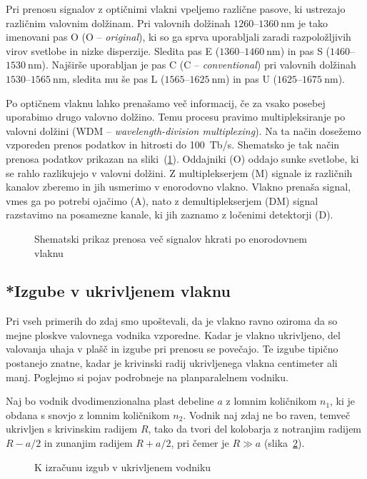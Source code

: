 \begin{remark}
Pri prenosu signalov z optičnimi vlakni vpeljemo različne pasove, ki ustrezajo 
različnim valovnim dolžinam. Pri valovnih dolžinah $1260$--$1360~\si{\nano\meter}$ je tako imenovani
pas O (O -- {\it original}), ki so ga sprva uporabljali zaradi razpoložljivih virov svetlobe
in nizke disperzije. Sledita pas E ($1360$--$1460~\si{\nano\meter}$) in pas S ($1460$--$1530~\si{\nano\meter}$). 
Najširše uporabljan je pas C (C -- {\it conventional}) pri valovnih dolžinah $1530$--$1565~\si{\nano\meter}$,
sledita mu še pas L ($1565$--$1625~\si{\nano\meter}$) in pas U ($1625$--$1675~\si{\nano\meter}$).

Po optičnem vlaknu lahko prenašamo več informacij, če za vsako posebej uporabimo
drugo valovno dolžino. Temu procesu pravimo multipleksiranje po valovni dolžini
(WDM -- {\it wavelength-division multiplexing}).
Na ta način dosežemo vzporeden prenos podatkov in hitrosti do 100~Tb/s.
Shematsko je tak način prenosa podatkov prikazan na sliki~(\ref{WDM}).
Oddajniki (O) oddajo sunke svetlobe, ki se rahlo razlikujejo v valovni dolžini. 
Z multiplekserjem (M) signale iz različnih kanalov zberemo in jih usmerimo v 
enorodovno vlakno. Vlakno prenaša signal, vmes ga po potrebi ojačimo (A), 
nato z demultiplekserjem (DM) signal razstavimo na posamezne kanale, ki jih 
zaznamo z ločenimi detektorji (D).
\begin{figure}[h]
\centering
\def\svgwidth{120truemm} 
 
\caption{Shematski prikaz prenosa več signalov hkrati po enorodovnem vlaknu}
\label{WDM}
\end{figure}
\end{remark}

\subsection*{*Izgube v ukrivljenem vlaknu}
Pri vseh primerih do zdaj smo upoštevali, da je vlakno ravno 
oziroma da so mejne ploskve valovnega vodnika vzporedne. 
Kadar je vlakno ukrivljeno, del valovanja uhaja v plašč in 
izgube pri prenosu se povečajo. Te izgube tipično postanejo znatne, 
kadar je krivinski radij ukrivljenega vlakna centimeter ali manj. 
Poglejmo si pojav podrobneje na planparalelnem vodniku.

Naj bo vodnik dvodimenzionalna plast debeline $a$ z lomnim količnikom
$n_{1}$, ki je obdana s snovjo z lomnim količnikom $n_{2}$. Vodnik naj
zdaj ne bo raven, temveč ukrivljen s krivinskim radijem $R$, tako da tvori 
del kolobarja z notranjim radijem $R-a/2$ in zunanjim radijem $R+a/2$, pri 
čemer je $R\gg a$ (slika~\ref{fig:bend}). 
\begin{figure}[h]
\centering
\def\svgwidth{60truemm} 
 
\caption{K izračunu izgub v ukrivljenem vodniku}
\label{fig:bend}
\end{figure}

